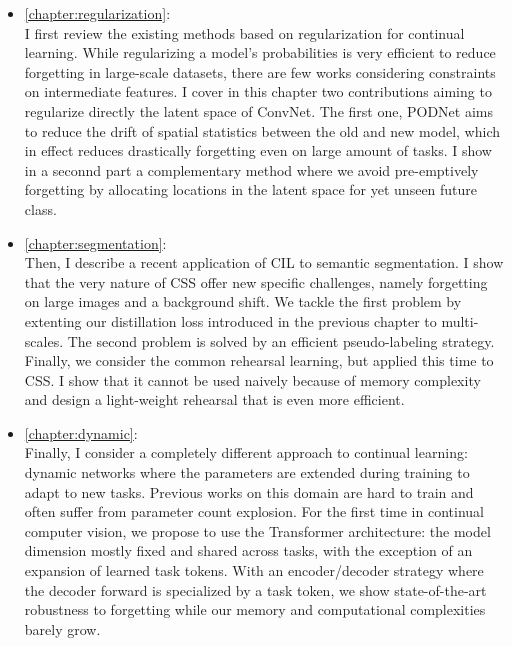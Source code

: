 \begin{itemize}
      \item \autoref{chapter:regularization}: \\
            I first review the existing methods based on regularization for continual learning. While
            regularizing a model's probabilities is very efficient to reduce forgetting in large-scale
            datasets, there are few works considering constraints on intermediate features. I cover in this
            chapter two contributions aiming to regularize directly the latent space of \acs{ConvNet}. The
            first one, \acf{PODNet} aims to reduce the drift of spatial statistics between the old and new
            model, which in effect reduces drastically forgetting even on large amount of tasks. I show in a
            seconnd part a complementary method where we avoid pre-emptively forgetting by allocating
            locations in the latent space for yet unseen future class.
      \item \autoref{chapter:segmentation}: \\
            Then, I describe a recent application of \acf{CIL} to semantic segmentation. I show that
            the very nature of \acf{CSS} offer new specific challenges, namely forgetting on large
            images and a background shift. We tackle the first problem by extenting our distillation
            loss introduced in the previous chapter to multi-scales. The second problem is solved by
            an efficient pseudo-labeling strategy. Finally, we consider the common rehearsal learning,
            but applied this time to \ac{CSS}. I show that it cannot be used naively because of memory
            complexity and design a light-weight rehearsal that is even more efficient.
      \item \autoref{chapter:dynamic}: \\
            Finally, I consider a completely different approach to continual learning: dynamic networks
            where the parameters are extended during training to adapt to new tasks. Previous works on
            this domain are hard to train and often suffer from parameter count explosion. For the
            first time in continual computer vision, we propose to use the Transformer architecture:
            the model dimension mostly fixed and shared across tasks, with the exception of an
            expansion of learned task tokens. With an encoder/decoder strategy where the decoder
            forward is specialized by a task token, we show state-of-the-art robustness to forgetting
            while our memory and computational complexities barely grow.
\end{itemize}

